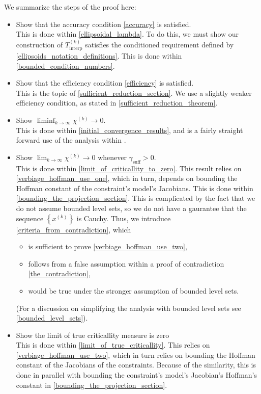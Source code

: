 \documentclass{article}
\theoremstyle{case}
\numberwithin{theorem}{subsection}
\newcommand{\chik}{{\chi^{(k)}}}
\newcommand{\gammabi}{\gamma_{\textrm{suff}}}
\newcommand{\sampletrk}{{T_{\text{interp}}^{(k)}}}
\newcommand{\xk}{x^{(k)}}
\begin{document}
We summarize the steps of the proof here:
\begin{itemize}
\item Show that the accuracy condition \cref{accuracy} is satisfied. \\
This is done within \cref{ellipsoidal_lambda}. 
To do this, we must show our construction of $\sampletrk$ satisfies the conditioned requirement defined by \cref{ellipsoids_notation_definitions}.
This is done within \cref{bounded_condition_numbers}.
\item Show that the efficiency condition \cref{efficiency} is satisfied. \\
This is the topic of \cref{sufficient_reduction_section}.
We use a slightly weaker efficiency condition, as stated in \cref{sufficient_reduction_theorem}.
\item Show $\liminf_{k\to\infty} \chik \to 0$. \\
This is done within \cref{initial_convergence_results}, and is a fairly straight forward use of the analysis within \cite{Conejo:2013:GCT:2620806.2621814}.
\item Show $\lim_{k\to\infty} \chik \to 0$ whenever $\gammabi > 0$. \\
This is done within \cref{limit_of_criticallity_to_zero}.
This result relies on \cref{verbiage_hoffman_use_one}, which in turn, depends on bounding the Hoffman constant of the constraint's model's Jacobians.
This is done within \cref{bounding_the_projection_section}.
This is complicated by the fact that we do not assume bounded level sets, so we do not have a gaurantee that the sequence $\left\{\xk\right\}$ is Cauchy.
Thus, we introduce \cref{criteria_from_contradiction}, which
\begin{itemize}
\item is sufficient to prove \cref{verbiage_hoffman_use_two},
\item follows from a false assumption within a proof of contradiction \cref{the_contradiction},
\item would be true under the stronger assumption of bounded level sets.
\end{itemize}
(For a discussion on simplifying the analysis with bounded level sets see \cref{bounded_level_sets}).
\item Show the limit of true criticallity measure is zero \\
This is done within \cref{limit_of_true_criticallity}.
This relies on \cref{verbiage_hoffman_use_two}, which in turn relies on bounding the Hoffman constant of the Jacobians of the constraints.
Because of the similarity, this is done in parallel with bounding the constraint's model's Jacobian's Hoffman's constant in \cref{bounding_the_projection_section}.
\end{itemize}
\end{document}

